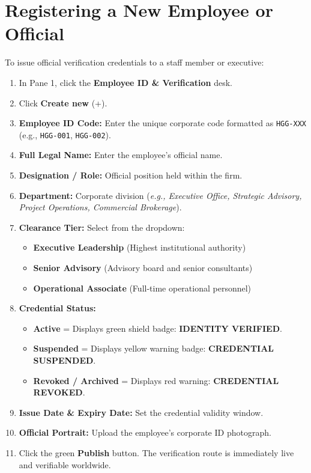 \documentclass[11pt,a4paper,oneside]{book}
\begin{document}
\section{Registering a New Employee or Official}
To issue official verification credentials to a staff member or executive:
\begin{enumerate}[leftmargin=*,label=\textbf{Step \arabic*:}]
  \item In Pane 1, click the \textbf{Employee ID \& Verification} desk.
  \item Click \textbf{Create new} (+).
  \item \textbf{Employee ID Code:} Enter the unique corporate code formatted as \texttt{HGG-XXX} (e.g., \texttt{HGG-001}, \texttt{HGG-002}).
  \item \textbf{Full Legal Name:} Enter the employee's official name.
  \item \textbf{Designation / Role:} Official position held within the firm.
  \item \textbf{Department:} Corporate division (\textit{e.g., Executive Office, Strategic Advisory, Project Operations, Commercial Brokerage}).
  \item \textbf{Clearance Tier:} Select from the dropdown:
    \begin{itemize}
      \item \textbf{Executive Leadership} (Highest institutional authority)
      \item \textbf{Senior Advisory} (Advisory board and senior consultants)
      \item \textbf{Operational Associate} (Full-time operational personnel)
    \end{itemize}
  \item \textbf{Credential Status:}
    \begin{itemize}
      \item \textcolor{HGGGreen}{\textbf{Active}} = Displays green shield badge: \textbf{IDENTITY VERIFIED}.
      \item \textcolor{HGGGold}{\textbf{Suspended}} = Displays yellow warning badge: \textbf{CREDENTIAL SUSPENDED}.
      \item \textcolor{HGGRed}{\textbf{Revoked / Archived}} = Displays red warning: \textbf{CREDENTIAL REVOKED}.
    \end{itemize}
  \item \textbf{Issue Date \& Expiry Date:} Set the credential validity window.
  \item \textbf{Official Portrait:} Upload the employee's corporate ID photograph.
  \item Click the green \textbf{Publish} button. The verification route is immediately live and verifiable worldwide.
\end{enumerate}
\end{document}
